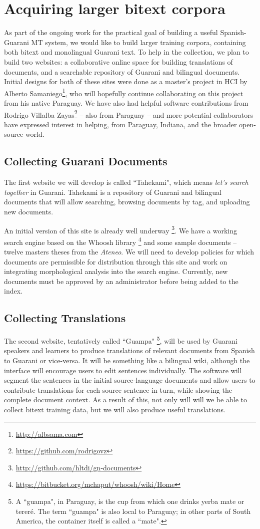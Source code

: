 \section{Acquiring larger bitext corpora}
As part of the ongoing work for the practical goal of building a useful
Spanish-Guarani MT system, we would like to build larger training corpora,
containing both bitext and monolingual Guarani text.
To help in the collection, we plan to build two websites:
a collaborative online space for building translations of documents, 
and a searchable repository of Guarani and bilingual documents.
Initial designs for both of these sites were done as a master's project in HCI
by Alberto Samaniego\footnote{\url{http://albsama.com}}, who will hopefully
continue collaborating on this project from his native Paraguay.
We have also had helpful software contributions from
Rodrigo Villalba Zayas\footnote{\url{https://github.com/rodrigovz}} --
also from Paraguay -- and more potential collaborators have expressed
interest in helping, from Paraguay, Indiana, and the broader open-source world.

\subsection{Collecting Guarani Documents}
The first website we will develop is called ``Tahekami", which means
\emph{let's search together} in Guarani.
Tahekami is a repository of Guarani and bilingual documents that will allow
searching, browsing documents by tag, and uploading new documents.

An initial version of this site is already well underway
\footnote{\url{http://github.com/hltdi/gn-documents}}.  We have a working
search engine based on the Whoosh library
\footnote{\url{https://bitbucket.org/mchaput/whoosh/wiki/Home}} and some sample
documents -- twelve masters theses from the \emph{Ateneo}. We will need to
develop policies for which documents are permissible for distribution through
this site and work on integrating morphological analysis into the search
engine. Currently, new documents must be approved by an administrator before
being added to the index.

\subsection{Collecting Translations}
The second website, tentatively called ``Guampa"
\footnote{A ``guampa", in Paraguay, is the cup from which one drinks yerba mate
or tereré. The term ``guampa" is also local to Paraguay; in other parts of
South America, the container itself is called a ``mate".},
will be used by Guarani speakers and learners to produce translations of
relevant documents from Spanish to Guarani or vice-versa.
It will be something like a bilingual wiki, although the interface will
encourage users to edit sentences individually.
The software will segment the sentences in the initial
source-language documents and allow users to contribute translations for each
source sentence in turn, while showing the complete document context.
As a result of this, not only will will we be able to collect bitext training
data, but we will also produce useful translations.

